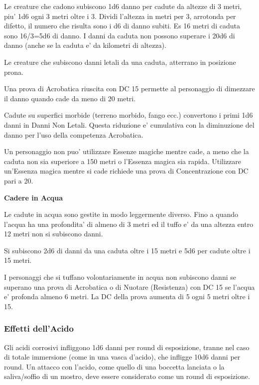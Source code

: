 \documentclass[a4paper,11pt,twoside,openany]{book}
\begin{document}
{		\label{cadute}
		
		Le creature che cadono subiscono 1d6 danno per cadute da altezze di 3 metri, piu' 1d6 ogni 3 metri oltre i 3. Dividi l'altezza in metri per 3, arrotonda per difetto, il numero che risulta sono i d6 di danno subiti. Es 16 metri di caduta sono 16/3=5d6 di danno. I danni da caduta non possono superare i 20d6 di danno (anche se la caduta e' da kilometri di altezza).
		
		Le creature che subiscono danni letali da una caduta, atterrano in posizione prona.
		
		Una prova di Acrobatica riuscita con DC 15 permette al personaggio di dimezzare il danno quando cade da meno di 20 metri.
		
		Cadute su superfici morbide (terreno morbido, fango ecc.) convertono i primi 1d6 danni in Danni Non Letali. Questa riduzione e' cumulativa con la diminuzione del danno per l'uso della competenza Acrobatica.
		
		Un personaggio non puo' utilizzare Essenze magiche mentre cade, a meno che la caduta non sia superiore a 150 metri o l'Essenza magica sia rapida. Utilizzare un'Essenza magica mentre si cade richiede una prova di Concentrazione con DC pari a 20.
		
		\textbf{Cadere in Acqua}
		
		Le cadute in acqua sono gestite in modo leggermente diverso. Fino a quando l'acqua ha una profondita' di almeno di 3 metri ed il tuffo e' da una altezza entro 12 metri non si subiscono danni.
		
		Si subiscono 2d6 di danni da una caduta oltre i 15 metri e 5d6 per cadute oltre i 15 metri.
		
		I personaggi che si tuffano volontariamente in acqua non subiscono danni se superano una prova di Acrobatica o di Nuotare (Resistenza) con DC 15 se l'acqua e' profonda almeno 6 metri. La DC della prova aumenta di 5 ogni 5 metri oltre i 15.
		
		\subsubsection{Effetti dell'Acido}
		
		\label{effetti-dellacido}
		
		Gli acidi corrosivi infliggono 1d6 danni per round di esposizione, tranne nel caso di totale immersione (come in una vasca d'acido), che infligge 10d6 danni per round. Un attacco con l'acido, come quello di una boccetta lanciata o la saliva/soffio di un mostro, deve essere considerato come un round di esposizione.
		
}
\end{document}
